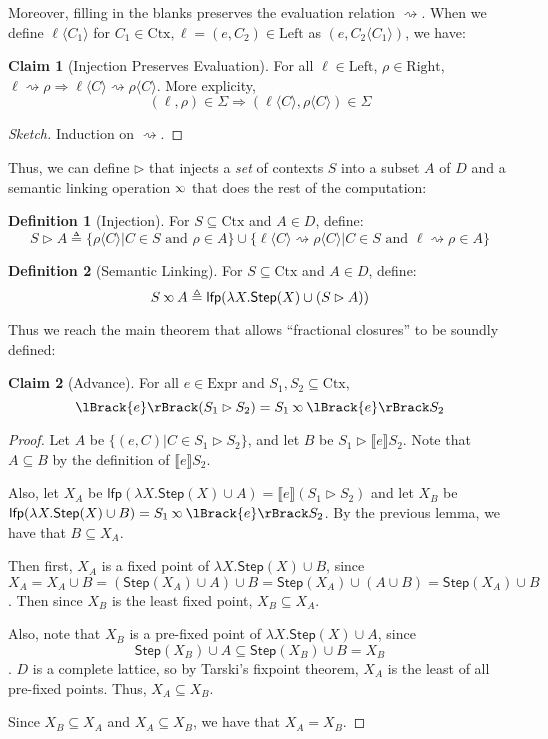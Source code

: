 \documentclass{article}
\theoremstyle{definition}
\newtheorem{definition}{Definition}[section]
\newtheorem{clm}{Claim}[section]
\newcommand*{\Expr}{\text{Expr}}
\newcommand*{\Ctx}{\text{Ctx}}
\newcommand*{\Left}{\text{Left}}
\newcommand*{\Right}{\text{Right}}
\newcommand*{\lfp}{\mathsf{lfp}}
\newcommand*{\Step}{\mathsf{Step}}
\newcommand*{\semarrow}{\rightsquigarrow}
\newcommand*{\semlink}{\mathbin{\rotatebox[origin=c]{180}{$\propto$}}}
\newcommand*{\sembracket}[1]{\lBrack{#1}\rBrack}
\newcommand*{\inject}[2]{{#2}\langle{#1}\rangle}
\begin{document}
Moreover, filling in the blanks preserves the evaluation relation $\semarrow$.
When we define $\inject{C_1}{\ell}$ for $C_1\in\Ctx,\ell=(e,C_2)\in\Left$ as $(e,\inject{C_1}{C_2})$, we have:
\begin{clm}[Injection Preserves Evaluation]
  For all $\ell\in\Left$, $\rho\in\Right$, $\ell\semarrow\rho\Rightarrow\inject{C}{\ell}\semarrow\inject{C}{\rho}$. More explicity,
  \[(\ell,\rho)\in\Sigma\Rightarrow(\inject{C}{\ell},\inject{C}{\rho})\in\Sigma\]
\end{clm}
\begin{proof}[Sketch]
  Induction on $\semarrow$.
\end{proof}

Thus, we can define $\rhd$ that injects a \emph{set} of contexts $S$ into a subset $A$ of $D$ and a semantic linking operation $\semlink$ that does the rest of the computation:
\begin{definition}[Injection]
  For $S\subseteq\Ctx$ and $A\in D$, define:
  \[S\rhd A\triangleq\{\inject{C}{\rho}|C\in S\text{ and }\rho\in A\}\cup\{\inject{C}{\ell}\semarrow\inject{C}{\rho}|C\in S\text{ and }\ell\semarrow\rho\in A\}\]
\end{definition}
\begin{definition}[Semantic Linking]
  For $S\subseteq\Ctx$ and $A\in D$, define:
  \[S\semlink A\triangleq\lfp(\lambda X.\Step(X)\cup(S\rhd A))\]
\end{definition}

Thus we reach the main theorem that allows ``fractional closures'' to be soundly defined:
\begin{clm}[Advance]
  For all $e\in\Expr$ and $S_1,S_2\subseteq\Ctx$,
  \[\sembracket{e}(S_1\rhd S_2)=S_1\semlink\sembracket{e}S_2\]
\end{clm}
\begin{proof}
  Let $A$ be $\{(e,C)|C\in S_1\rhd S_2\}$, and let $B$ be $S_1\rhd\sembracket{e}S_2$.
  Note that $A\subseteq B$ by the definition of $\sembracket{e}S_2$.

  Also, let $X_A$ be $\lfp(\lambda X.\Step(X)\cup A)=\sembracket{e}(S_1\rhd S_2)$ and let $X_B$ be $\lfp(\lambda X.\Step(X)\cup B)=S_1\semlink\sembracket{e}S_2$.
  By the previous lemma, we have that $B\subseteq X_A$.

  Then first, $X_A$ is a fixed point of $\lambda X.\Step(X)\cup B$, since
  \[X_A=X_A\cup B=(\Step(X_A)\cup A)\cup B=\Step(X_A)\cup(A\cup B)=\Step(X_A)\cup B\]
  . Then since $X_B$ is the least fixed point, $X_B\subseteq X_A$.

  Also, note that $X_B$ is a pre-fixed point of $\lambda X.\Step(X)\cup A$, since
  \[\Step(X_B)\cup A\subseteq\Step(X_B)\cup B=X_B\]
  . $D$ is a complete lattice, so by Tarski's fixpoint theorem, $X_A$ is the least of all pre-fixed points.
  Thus, $X_A\subseteq X_B$.

  Since $X_B\subseteq X_A$ and $X_A\subseteq X_B$, we have that $X_A=X_B$.
\end{proof}
\end{document}
